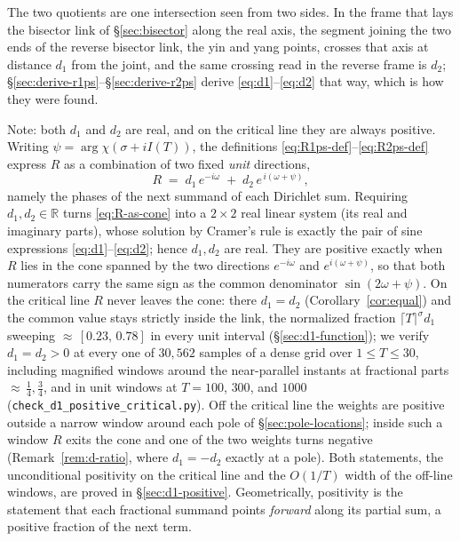 \documentclass[11pt]{article}
\theoremstyle{definition}
\begin{document}
The two quotients are one intersection seen from two sides. In the frame that
lays the bisector link of \S\ref{sec:bisector} along the real axis, the segment
joining the two ends of the reverse bisector link, the yin and yang points,
crosses that axis at distance $d_1$ from the joint, and the same crossing read in
the reverse frame is $d_2$; \S\ref{sec:derive-r1ps}--\S\ref{sec:derive-r2ps}
derive \eqref{eq:d1}--\eqref{eq:d2} that way, which is how they were found.

Note: both $d_1$ and $d_2$ are real, and on the critical line they are always
positive. Writing $\psi=\arg\chi(\sigma+iI(T))$, the
definitions \eqref{eq:R1ps-def}--\eqref{eq:R2ps-def} express $R$ as a combination
of two fixed \emph{unit} directions,
\begin{equation}\label{eq:R-as-cone}
R \;=\; d_1\,e^{-i\omega} \;+\; d_2\,e^{\,i(\omega+\psi)},
\end{equation}
namely the phases of the next summand of each Dirichlet sum. Requiring
$d_1,d_2\in\mathbb{R}$ turns \eqref{eq:R-as-cone} into a $2\times2$ real linear
system (its real and imaginary parts), whose solution by Cramer's rule is exactly
the pair of sine expressions \eqref{eq:d1}--\eqref{eq:d2}; hence $d_1,d_2$ are
real. They are positive exactly when $R$ lies in the cone spanned by the two
directions $e^{-i\omega}$ and $e^{i(\omega+\psi)}$, so that both numerators carry the
same sign as the common denominator $\sin(2\omega+\psi)$. On the critical line
$R$ never leaves the cone: there $d_1=d_2$ (Corollary~\ref{cor:equal}) and the
common value stays strictly inside the link, the normalized fraction
$\lceil T\rceil^{\sigma}d_1$ sweeping ${\approx}\,[0.23,\,0.78]$ in every unit
interval (\S\ref{sec:d1-function}); we verify $d_1=d_2>0$ at every one of
$30{,}562$ samples of a dense grid over $1\le T\le30$, including magnified
windows around the near-parallel instants at fractional parts
${\approx}\,\tfrac14,\tfrac34$, and in unit windows at $T=100$, $300$, and
$1000$ (\texttt{check\_d1\_positive\_critical.py}). Off the critical line the
weights are positive outside a narrow window around each pole of
\S\ref{sec:pole-locations}; inside such a window $R$ exits the cone and one of
the two weights turns negative (Remark~\ref{rem:d-ratio}, where $d_1=-d_2$
exactly at a pole). Both statements, the unconditional positivity on the
critical line and the $O(1/T)$ width of the off-line windows, are proved in
\S\ref{sec:d1-positive}. Geometrically, positivity is the statement that each
fractional summand points \emph{forward} along its
partial sum, a positive fraction of the next term.
\end{document}
